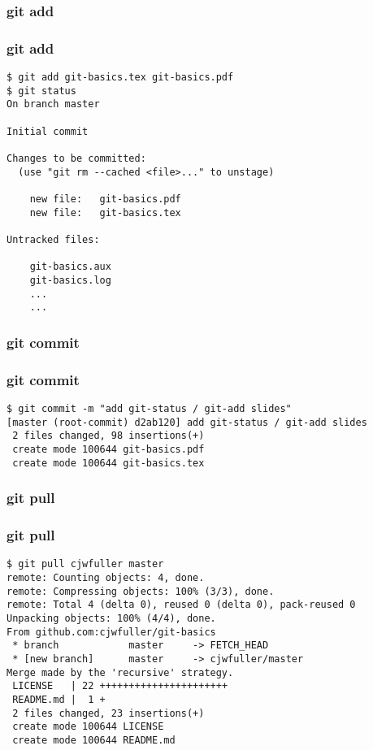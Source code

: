 \documentclass{beamer}
\begin{document}

\begin{frame}
\frametitle{git add}

\end{frame}


\begin{frame}[fragile]
\frametitle{git add}
	\scriptsize
	\begin{verbatim}
$ git add git-basics.tex git-basics.pdf
$ git status
On branch master

Initial commit

Changes to be committed:
  (use "git rm --cached <file>..." to unstage)

	new file:   git-basics.pdf
	new file:   git-basics.tex

Untracked files:

	git-basics.aux
	git-basics.log
	...
	...
	\end{verbatim}
\end{frame}


\begin{frame}
\frametitle{git commit}

\end{frame}


\begin{frame}[fragile]
\frametitle{git commit}
	\scriptsize
	\begin{verbatim}
$ git commit -m "add git-status / git-add slides"
[master (root-commit) d2ab120] add git-status / git-add slides
 2 files changed, 98 insertions(+)
 create mode 100644 git-basics.pdf
 create mode 100644 git-basics.tex
	\end{verbatim}
\end{frame}


\begin{frame}
\frametitle{git pull}

\end{frame}


\begin{frame}[fragile]
\frametitle{git pull}
	\scriptsize
	\begin{verbatim}
$ git pull cjwfuller master
remote: Counting objects: 4, done.
remote: Compressing objects: 100% (3/3), done.
remote: Total 4 (delta 0), reused 0 (delta 0), pack-reused 0
Unpacking objects: 100% (4/4), done.
From github.com:cjwfuller/git-basics
 * branch            master     -> FETCH_HEAD
 * [new branch]      master     -> cjwfuller/master
Merge made by the 'recursive' strategy.
 LICENSE   | 22 ++++++++++++++++++++++
 README.md |  1 +
 2 files changed, 23 insertions(+)
 create mode 100644 LICENSE
 create mode 100644 README.md
	\end{verbatim}
\end{frame}
\end{document}
